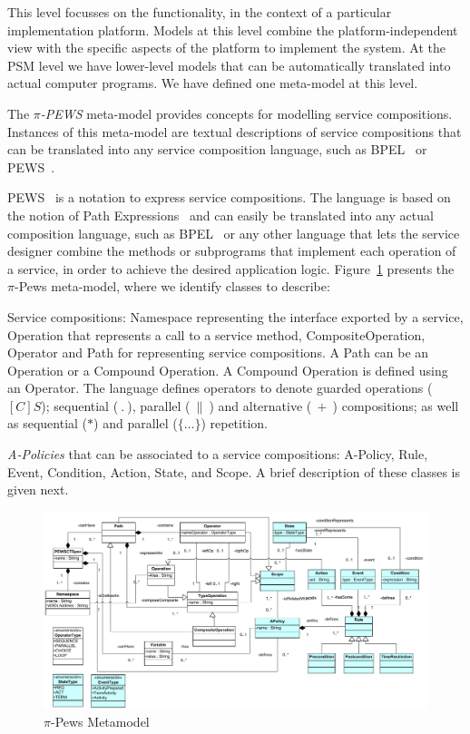 This level focusses on the functionality, in the context of a particular implementation platform.
Models at this level combine the platform-independent view with the specific aspects of the platform to implement the system. At the PSM level we have lower-level models that can be automatically translated into actual computer programs. 
We have defined one meta-model at this level.

The \textit{$\pi$-PEWS} meta-model provides concepts for modelling service compositions. 
Instances of this meta-model are textual descriptions of service compositions that can be translated into any service composition language, such as BPEL~\cite{bpel03} or PEWS~\cite{BaCAM05,Placido2010LTPD}.

PEWS~\cite{BHM06,Placido2010LTPD} is a notation to express service compositions.
The language is based on the notion of Path Expressions~\cite{And79} and can easily be translated into any actual composition language, such as BPEL~\cite{bpel03} or any other language that lets the service designer combine the methods or subprograms that implement each operation of a service, in order to achieve the desired application logic. 
Figure~\ref{fig:metamodel} presents the $\pi$-{\sc Pews} meta-model, where we identify classes to describe:
\begin{itemizedTrivlist}
\item Service compositions: {\sc Namespace} representing the interface exported by a service, {\sc Operation} that represents a call to a service method, {\sc CompositeOperation}, {\sc Operator} and {\sc Path} for representing service compositions.
A {\sc Path} can be an {\sc Operation} or a {\sc Compound Operation}. 
A {\sc Compound Operation} is defined using an {\sc Operator}.
The language defines operators to denote guarded operations ($[C]S$); sequential ($\ . \ $), parallel ($\ \| \ $) and alternative ($\ + \ $) compositions; as well as sequential ($*$) and parallel ($\{\dots\}$) repetition.

\item {\em A-Policies} that can be associated to a service compositions:  {\sc A-Policy}, {\sc Rule}, {\sc Event}, {\sc Condition}, {\sc Action}, {\sc State}, and {\sc Scope}.
A brief description of these classes is given next.
\end{itemizedTrivlist}
%
\begin{figure}[t]
\centering
\includegraphics[width=1.0\textwidth]{figs/PEWSMetamodel}
\caption{$\pi$-{\sc Pews} Metamodel}
\label{fig:metamodel}
\end{figure}

